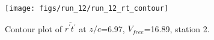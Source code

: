 \begin{figure}[H]
\centering
\texttt{[image: figs/run\_12/run\_12\_rt\_contour]}
\caption{Contour plot of $\overline{r^\prime t^\prime}$ at $z/c$=6.97, $V_{free}$=16.89, station 2.}
\label{fig:run_12_rt_contour}
\end{figure}



